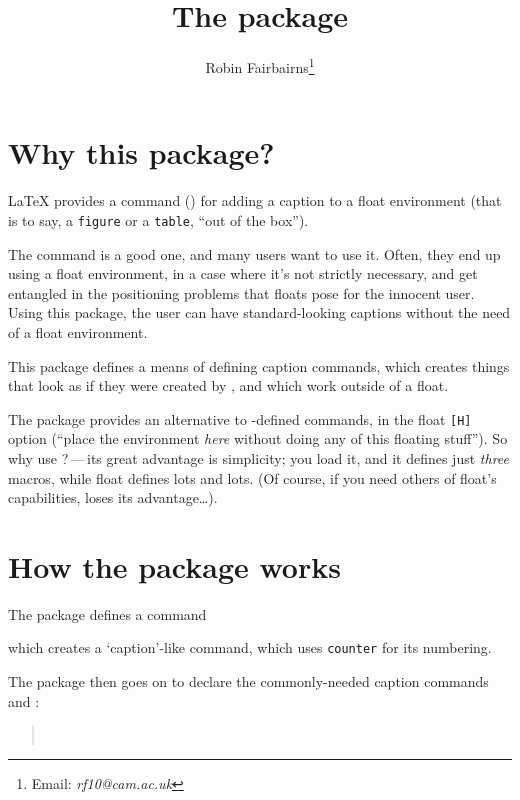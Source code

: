 \documentclass[a4paper]{article}
\begin{document}
\title{The  package}
\author{Robin Fairbairns\thanks{Email: \emph{rf10@cam.ac.uk}}}
\maketitle

\section{Why this package?}

\LaTeX{} provides a command () for adding a caption to a
float environment (that is to say, a \texttt{figure} or a
\texttt{table}, ``out of the box'').

The command is a good one, and many users want to use it.  Often,
they end up using a float environment, in a case where it's not
strictly necessary, and get entangled in the positioning problems
that floats pose for the innocent user.  Using this package, the
user can have standard-looking captions without the need of a float
environment.

This package defines a means of defining caption commands, which
creates things that look as if they were created by , and
which work outside of a float.

The  package provides an alternative to
-defined commands, in the float \texttt{[H]} option
(``place the environment \emph{here} without doing any of this
floating stuff'').  So why use ?\,---\,its great
advantage is simplicity; you load it, and it defines just \emph{three}
macros, while \textsf{float} defines lots and lots.  (Of course, if
you need others of \textsf{float}'s capabilities, 
loses its advantage\dots).

\section{How the package works}

The package defines a command
\begin{quote}
\end{quote}
which creates a `caption'-like command, which uses \texttt{counter}
for its numbering.

The package then goes on to declare the commonly-needed caption
commands  and :
\begin{quote}
  \\
\end{quote}
\end{document}
